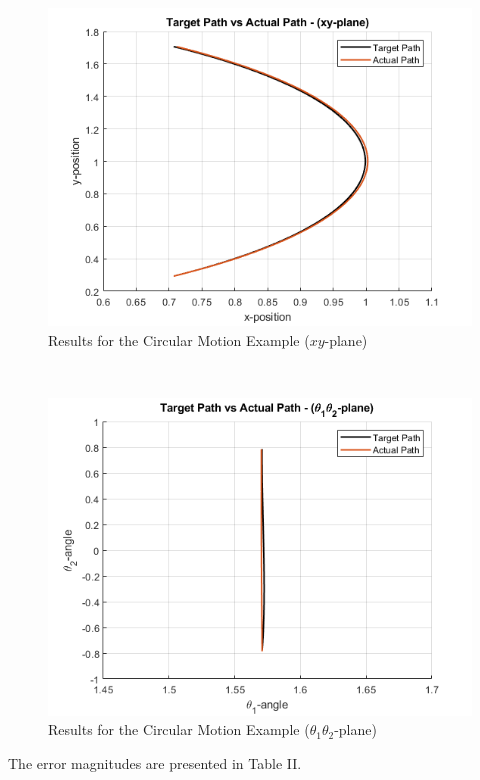 \documentclass[letterpaper, 10 pt, conference]{ieeeconf}
\begin{document}
{\centering
\begin{figure}[htbp]
\captionsetup{justification=centering}
\centerline{\includegraphics[scale=.475]{results_3_1.png}}
\caption{Results for the Circular Motion Example ($xy$-plane)}
\label{fig}
\end{figure}
\\
\begin{figure}[htbp]
\captionsetup{justification=centering}
\centerline{\includegraphics[scale=.475]{results_3_2.png}}
\caption{Results for the Circular Motion Example ($\theta_{1}\theta_{2}$-plane)}
\label{fig}
\end{figure}
}

The error magnitudes are presented in Table II.
\end{document}
